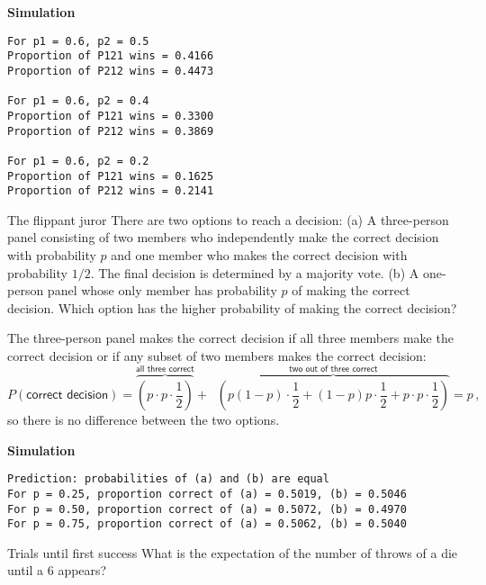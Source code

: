 \textbf{Simulation}
\begin{verbatim}
For p1 = 0.6, p2 = 0.5
Proportion of P121 wins = 0.4166
Proportion of P212 wins = 0.4473

For p1 = 0.6, p2 = 0.4
Proportion of P121 wins = 0.3300
Proportion of P212 wins = 0.3869

For p1 = 0.6, p2 = 0.2
Proportion of P121 wins = 0.1625
Proportion of P212 wins = 0.2141
\end{verbatim}


\begin{prob}{The flippant juror}
There are two options to reach a decision: (a) A three-person panel consisting of two members who independently make the correct decision with probability $p$ and one member who makes the correct decision with probability $1/2$. The final decision is determined by a majority vote. (b) A one-person panel whose only member has probability $p$ of making the correct decision. Which option has the higher probability of making the correct decision?
\end{prob}

\solution{}

The three-person panel makes the correct decision if all three members make the correct decision or if any subset of two members makes the correct decision:
\[
P(\textsf{correct decision})=\overbrace{\left(p\cdot p\cdot\frac{1}{2}\right)}^{\textsf{all three correct}}+\;\;\overbrace{\left(p(1-p)\cdot\frac{1}{2}+(1-p)p\cdot\frac{1}{2}+p\cdot p\cdot\frac{1}{2}\right)}^{\textsf{two out of three correct}}=p\,,
\]
so there is no difference between the two options.

\textbf{Simulation}
\begin{verbatim}
Prediction: probabilities of (a) and (b) are equal
For p = 0.25, proportion correct of (a) = 0.5019, (b) = 0.5046
For p = 0.50, proportion correct of (a) = 0.5072, (b) = 0.4970
For p = 0.75, proportion correct of (a) = 0.5062, (b) = 0.5040
\end{verbatim}


\begin{prob}{Trials until first success}
\label{p.four}
What is the expectation of the number of throws of a die until a $6$ appears?
\end{prob}


